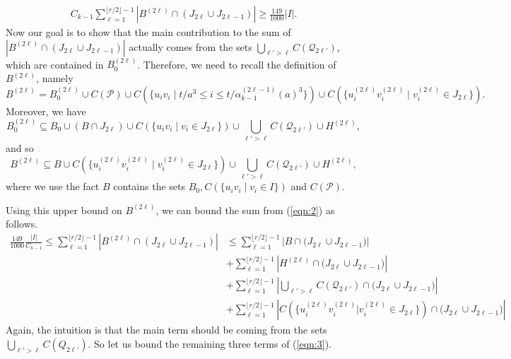 \documentclass[a4paper,11pt]{article}
\makeatletter
\renewenvironment{proof}[1][\proofname] {\par\pushQED{\qed}\normalfont\topsep6\p@\@plus6\p@\relax\trivlist\item[\hskip\labelsep\bfseries#1\@addpunct{.}]\ignorespaces}{\popQED\endtrivlist\@endpefalse}
\theoremstyle{definition}
\def\cP{\mathcal{P}}
\def\cQ{\mathcal{Q}}
\makeatother
\begin{document}
\begin{proof}
\begin{proof}
\begin{align}
C_{k-1}\sum_{\ell=1}^{\lfloor r/2\rfloor -1} |B^{(2\ell)}\cap (J_{2\ell}\cup J_{2\ell-1})|\geq \frac{149}{1000}|I|.
\end{align}
Now our goal is to show that the main contribution to the sum of $|B^{(2\ell)}\cap (J_{2\ell}\cup J_{2\ell-1})|$ actually comes from the sets $\bigcup_{\ell'>\ell} C(\cQ_{2\ell'})$, which are contained in $B_0^{(2\ell)}$. Therefore, we need to recall the definition of $B^{(2\ell)}$, namely $$B^{(2\ell)}=B_0^{(2\ell)}\cup C(\cP) \cup C(\{u_iv_i\mid t/a^3\leq i\leq t/\alpha_{k-1}^{(2\ell-1)}(a)^3\}) \cup C(\{u_i^{(2\ell)}v_i^{(2\ell)}\mid v_i^{(2\ell)}\in J_{2\ell}\}).$$
Moreover, we have 
\[B^{(2\ell)}_0 \subseteq B_0 \cup (B\cap J_{2\ell}) \cup C(\{u_iv_i\mid v_i\in J_{2\ell}\})\cup \bigcup_{\ell'>\ell} C(\cQ_{2\ell'})\cup H^{(2\ell)},\]
and so 
\[B^{(2\ell)}\subseteq B\cup 
C(\{u_i^{(2\ell)}v_i^{(2\ell)}\mid v_i^{(2\ell)}\in J_{2\ell}\}) \cup \bigcup_{\ell'>\ell} C(\cQ_{2\ell'})\cup H^{(2\ell)},\]
where we use the fact $B$ contains the sets $B_0, C(\{u_iv_i\mid v_i\in I\})$ and $C(\cP)$.

Using this upper bound on $B^{(2\ell)}$, we can bound the sum from (\ref{eqn:2}) as follows.
\begin{equation}
\begin{aligned}
\frac{149}{1000}\frac{|I|}{C_{k-1}}\leq \sum_{\ell=1}^{\lfloor r/2\rfloor -1} |B^{(2\ell)}\cap (J_{2\ell}\cup J_{2\ell-1})| 
&\leq \sum_{\ell=1}^{\lfloor r/2\rfloor -1} \left|B \cap \big(J_{2\ell}\cup J_{2\ell-1}\big)\right| \\
&+ \sum_{\ell=1}^{\lfloor r/2\rfloor -1} \left|H^{(2\ell)} \cap \big(J_{2\ell}\cup J_{2\ell-1}\big)\right| \\
&+\sum_{\ell=1}^{\lfloor r/2\rfloor -1}\left|\bigcup_{\ell'>\ell} C(\cQ_{2\ell'}) \cap \big(J_{2\ell}\cup J_{2\ell-1}\big)\right|\\
&+\sum_{\ell=1}^{\lfloor r/2\rfloor -1}\left|C(\{u_i^{(2\ell)}v_i^{(2\ell)}|v_i^{(2\ell)}\in J_{2\ell}\})\cap \big(J_{2\ell}\cup J_{2\ell-1}\big)\right|
\end{aligned}
\label{eqn:3}
\end{equation}
Again, the intuition is that the main term should be coming from the sets $\bigcup_{\ell'>\ell} C(Q_{2\ell'})$. So let us bound the remaining three terms of (\ref{eqn:3}). 


\end{proof}
\end{proof}
\end{document}
